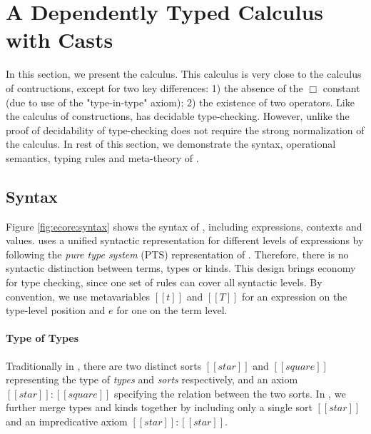 
\section{A Dependently Typed Calculus with Casts}\label{sec:ecore}

In this section, we present the \ecore calculus. This calculus is very 
close to the calculus of contructions, except for two key differences: 
1) the absence of the $\Box$ constant (due to use of the "type-in-type"
axiom); 2) the existence of two \cast operators. Like the calculus 
of constructions, \ecore has decidable type-checking. However, unlike
\cc the proof of decidability of type-checking does not require 
the strong normalization of the calculus. 
In rest of this
section, we demonstrate the syntax, operational semantics, typing
rules and meta-theory of \ecore.


\subsection{Syntax}\label{sec:ecore:syn}

Figure \ref{fig:ecore:syntax} shows the syntax of \ecore, including
expressions, contexts and values. \ecore uses a unified syntactic
representation for different levels of expressions by following the
\emph{pure type system} (PTS) representation of \cc. Therefore, there
is no syntactic distinction between terms, types or kinds. This design
brings economy for type checking, since one set of rules can cover
all syntactic levels. By convention, we use metavariables $[[t]]$ and
$[[T]]$ for an expression on the type-level position and $e$ for one
on the term level.

\paragraph{Type of Types}
Traditionally in \cc, there are two distinct
sorts $[[star]]$ and $[[square]]$ representing the type of
\emph{types} and \emph{sorts} respectively, and an axiom
$[[star]]:[[square]]$ specifying the relation between the two sorts. In \ecore, we further
merge types and kinds together by including only a single sort
$[[star]]$ and an impredicative axiom $[[star]]:[[star]]$. 


